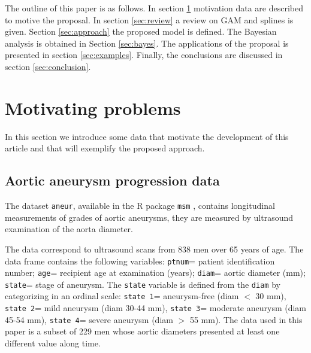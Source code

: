 \documentclass[11pt,letterpaper]{article}
\begin{document}

The outline of this paper is as follows. 
In section \ref{sec:motiva} motivation data are described to motive the proposal. 
In section \ref{sec:review} a review on GAM and splines is given. 
Section \ref{sec:approach} the proposed model is defined. 
The Bayesian analysis is obtained in Section  \ref{sec:bayes}.
The applications of the proposal is presented in section \ref{sec:examples}. 
Finally, the conclusions are discussed in section \ref{sec:conclusion}. 





\section{Motivating problems}\label{sec:motiva}

In this section we introduce some data that motivate the development of this article and that will exemplify the proposed approach.



\subsection{Aortic aneurysm progression data}  


The dataset \texttt{aneur}, available in the R package \texttt{msm} \cite{Jac11}, contains longitudinal measurements of grades of aortic aneurysms, they are measured by ultrasound examination of the aorta diameter. 

The data correspond to ultrasound scans from 838 men over 65 years of age. 
The data frame contains the following variables: 
\texttt{ptnum}= patient identification number; 
\texttt{age}= recipient age at examination (years); 
\texttt{diam}= aortic diameter (mm); 
\texttt{state}= stage of aneurysm. 
The \texttt{state} variable is defined from the \texttt{diam} by categorizing in an ordinal scale: 
\texttt{state 1}= aneurysm-free (diam $<$ 30 mm), 
\texttt{state 2}= mild aneurysm (diam 30-44 mm), 
\texttt{state 3}= moderate aneurysm	(diam 45-54 mm), 
\texttt{state 4}= severe aneurysm (diam $>$ 55 mm). 
The data used in this paper is  a subset of 229 men whose aortic diameters presented at least one different value along time. 
\end{document}
